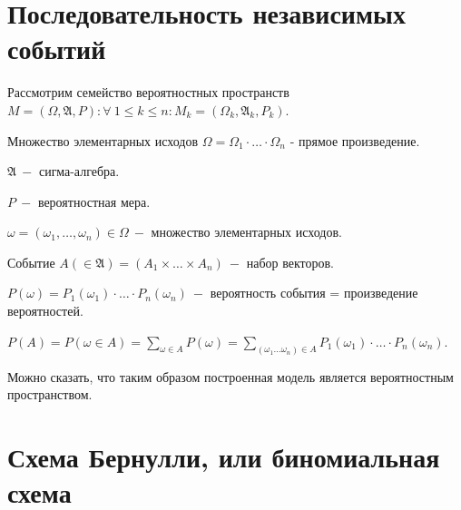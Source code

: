 \documentclass[../Main.tex]{subfiles}
\begin{document}

\section{Последовательность независимых событий}

Рассмотрим семейство вероятностных пространств \(M = (\Omega, \mathfrak{A}, P): \forall \ 1 \leq k \leq n: M_k = (\Omega_k, \mathfrak{A}_k, P_k)\).

Множество элементарных исходов \(\Omega = \Omega_1 \cdot \dotsc \cdot \Omega_n\) - прямое произведение.

\(\mathfrak{A} \ -\) сигма-алгебра.

\(P \ -\) вероятностная мера.

\(\omega = (\omega_1, \dotsc, \omega_n) \in \Omega\ -\) множество элементарных исходов.

Событие \( A (\in \mathfrak{A}) = (A_1 \times \dotsc \times A_n) \ -\) набор векторов.

\(P(\omega) = P_1(\omega_1) \cdot \dotsc \cdot P_n(\omega_n ) \ -\) вероятность события = произведение вероятностей.

\(P(A) = P(\omega \in A) = \underset{\omega \in A}{\sum}P(\omega) = \underset{(\omega_1 \dotsc \omega_n)\in A}{\sum}P_1(\omega_1) \cdot \dotsc \cdot P_n(\omega_n)\).

Можно сказать, что таким образом построенная модель является вероятностным пространством.

\section{Схема Бернулли, или биномиальная схема}
\end{document}
